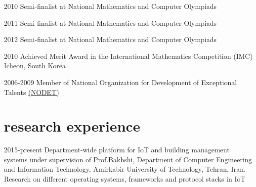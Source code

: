\documentclass[]{friggeri-cv} %
\begin{document}
\begin{entrylist}

	\entry
	{2010}
	{\textcolor{TextOrange}{Semi-finalist} {\normalfont at National Mathematics and Computer Olympiads}}
	{}
	{}


	\entry
	{2011}
	{\textcolor{TextOrange}{Semi-finalist} {\normalfont at National Mathematics and Computer Olympiads}}
	{}
	{}


	\entry
	{2012}
	{\textcolor{TextOrange}{Semi-finalist} {\normalfont at National Mathematics and Computer Olympiads}}
	{}
	{}


	\entry
	{2010}
	{{\normalfont Achieved} \textcolor{Ocean}{Merit Award} {\normalfont in the International Mathematics Competition (IMC) Icheon, South Korea}}
	{}
	{}


	\entry
	{2006-2009}
	{\normalfont Member of National Organization for Development of Exceptional Talents \href{https://en.wikipedia.org/wiki/National_Organization_for_Development_of_Exceptional_Talents}{(NODET)}}
	{}
	{}


\end{entrylist}


\section{research experience}

\begin{entrylist}

	\entry
	{2015-present}
	{Department-wide platform for IoT and building management systems}
	{under supervision of Prof.Bakhshi, Department of Computer Engineering and Information Technology, Amirkabir University of Technology, Tehran, Iran.}
	{Research on different operating systems, frameworks and protocol stacks in IoT}

\end{entrylist}

\end{document}
